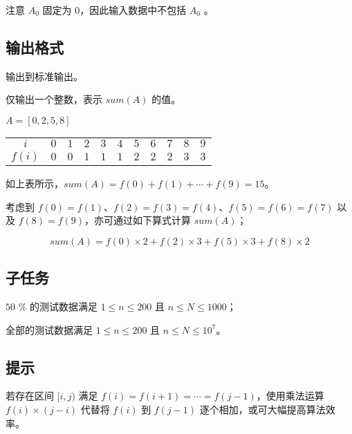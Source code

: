 注意 $A_0$
 固定为 $0$，因此输入数据中不包括 $A_0$ 
。

\subsection*{输出格式}

输出到标准输出。

仅输出一个整数，表示 $sum(A)$ 的值。

\examplebox*{}{}

$A=[0, 2, 5, 8]$

\begin{table}[H]
  \centering
  \begin{tabular}{ccccccccccc}
    \toprule
    $i$ & $0$ & $1$ & $2$ & $3$ & $4$ & $5$ & $6$ & $7$ & $8$ & $9$ \\
    $f(i)$ & $0$ & $0$ & $1$ & $1$ & $1$ & $2$ & $2$ & $2$ & $3$ & $3$ \\
    \bottomrule
  \end{tabular}
\end{table}

如上表所示，$sum(A)=f(0)+f(1)+\cdots + f(9)=15$。

考虑到 $f(0)=f(1)$、$f(2)=f(3)=f(4)$、$f(5)=f(6)=f(7)$ 以及 $f(8)=f(9)$，亦可通过如下算式计算 $sum(A)$；

\begin{equation*}
  sum(A)=f(0)\times 2+f(2)\times 3+f(5)\times 3 + f(8)\times 2
\end{equation*}

\examplebox{}{}

\subsection*{子任务}

$50$ \% 的测试数据满足 $1\le n\le 200$ 且 $n\le N\le 1000$；

全部的测试数据满足 $1\le n\le 200$ 且 $n\le N\le 10^7$。

\subsection*{提示}

若存在区间 $[i,j)$ 满足 $f(i)=f(i+1)=\cdots=f(j-1)$，使用乘法运算 $f(i)\times (j-i)$ 代替将 $f(i)$ 到 $f(j-1)$ 逐个相加，或可大幅提高算法效率。
